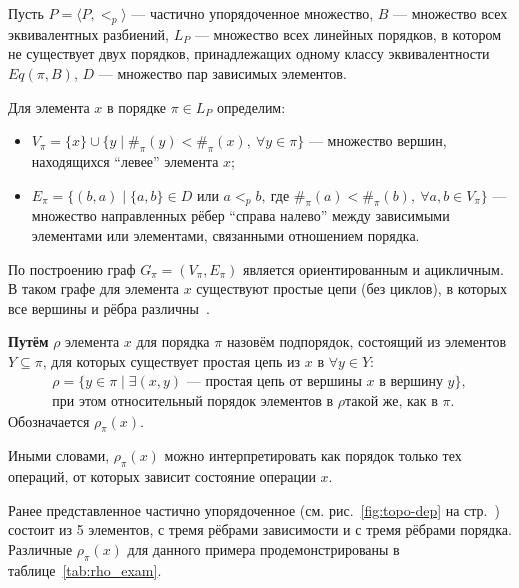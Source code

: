 Пусть $P = \langle P, <_{p} \rangle$ — частично упорядоченное
множество, $B$ — множество всех эквивалентных разбиений, $L_P$ —
множество всех линейных порядков, в котором не существует двух
порядков, принадлежащих одному классу эквивалентности $Eq(\pi, B)$,
$D$ — множество пар зависимых элементов.

Для элемента $x$ в порядке $\pi \in L_P$ определим:
\begin{itemize}
  \item $V_\pi = \{x\} \cup \{y \mid \#_{\pi}(y) <
    \#_{\pi}(x),\ \forall y \in \pi\}$ — множество вершин,
    находящихся ``левее'' элемента $x$;
  \item $E_\pi = \{(b, a) \mid \{a, b\} \in D \text{ или } a <_p
      b,\ \text{где } \#_{\pi}(a) < \#_{\pi}(b),\ \forall a,b \in
    V_\pi\}$ — множество направленных рёбер ``справа налево'' между
    зависимыми элементами или элементами, связанными отношением порядка.
\end{itemize}
По построению граф $G_\pi = (V_\pi, E_\pi)$ является ориентированным
и ацикличным. В таком графе для элемента $x$ существуют простые цепи
(без циклов), в которых все вершины и рёбра различны~\cite{graph-theory}.

\begin{definition}
  \textbf{Путём} $\rho$ элемента $x$ для порядка $\pi$ назовём
  подпорядок, состоящий из элементов $Y \subseteq \pi$, для которых
  существует простая цепь из $x$ в $\forall y \in Y$:
  \begin{equation}
    \begin{aligned}
      \rho = \{y \in \pi \mid \exists (x, y) \text{ — простая цепь от
      вершины } x \text{ в вершину } y\}, \\
      \text{при этом относительный порядок элементов в } \rho \text{
      такой же, как в } \pi.
    \end{aligned}
    \label{eq:def_suborder}
  \end{equation}
  Обозначается $\rho_{\pi}(x)$.
\end{definition}

Иными словами, $\rho_{\pi}(x)$ можно интерпретировать как порядок
только тех операций, от которых зависит состояние операции $x$.

Ранее представленное частично упорядоченное (см.
рис.~\ref{fig:topo-dep} на стр.~\pageref{fig:topo-dep}) состоит из 5
элементов, с
тремя рёбрами зависимости и с тремя рёбрами порядка. Различные
$\rho_{\pi}(x)$ для данного примера продемонстрированы в
таблице~\ref{tab:rho_exam}.

